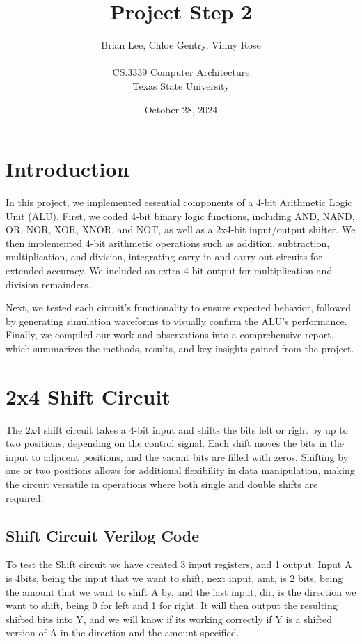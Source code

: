 \documentclass[12pt]{article}
\title{Project Step 2}
\author{Brian Lee, Chloe Gentry, Vinny Rose\\
\AND\\
\AND
\AND
\AND
\AND
	CS.3339 Computer Architecture\\
\AND
	Texas State University\\
}
\date{October 28, 2024}
\begin{document}
\maketitle

\newpage
\tableofcontents
\thispagestyle{empty}


\newpage
\setcounter{page}{1}
\section{Introduction}
In this project, we implemented essential components of a 4-bit Arithmetic Logic Unit (ALU). First, we coded 4-bit binary logic functions, including AND, NAND, OR, NOR, XOR, XNOR, and NOT, as well as a 2x4-bit input/output shifter. We then implemented 4-bit arithmetic operations such as addition, subtraction, multiplication, and division, integrating carry-in and carry-out circuits for extended accuracy. We included an extra 4-bit output for multiplication and division remainders.

Next, we tested each circuit's functionality to ensure expected behavior, followed by generating simulation waveforms to visually confirm the ALU’s performance. Finally, we compiled our work and observations into a comprehensive report, which summarizes the methods, results, and key insights gained from the project.

\section{2x4 Shift Circuit}
\label{sec:headings}

The 2x4 shift circuit takes a 4-bit input and shifts the bits left or right by up to two positions, depending on the control signal. Each shift moves the bits in the input to adjacent positions, and the vacant bits are filled with zeros. Shifting by one or two positions allows for additional flexibility in data manipulation, making the circuit versatile in operations where both single and double shifts are required.
\subsection{Shift Circuit Verilog Code}


To test the Shift circuit we have created 3 input registers, and 1 output. Input A is 4bits, being the input that we want to shift, next input, amt, is 2 bits, being the amount that we want to shift A by, and the last input, dir, is the direction we want to shift, being 0 for left and 1 for right. It will then output the resulting shifted bits into Y, and we will know if its working correctly if Y is a shifted version of A in the direction and the amount specified.

\end{document}
